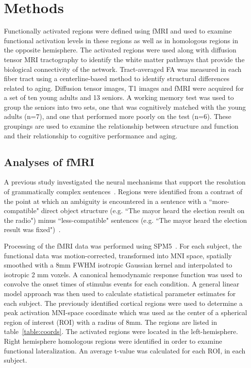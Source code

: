 \section{Methods}
\label{sec:methods}
Functionally activated regions were defined using fMRI and used to examine functional activation levels in these regions as well as in homologous regions in the opposite hemisphere. The activated regions were used along with diffusion tensor MRI tractography to identify the white matter pathways that provide the biological connectivity of the network. Tract-averaged FA was measured in each fiber tract using a centerline-based method to identify structural differences related to aging. Diffusion tensor images, T1 images and fMRI were acquired for a set of ten young adults and 13 seniors. A working memory test was used to group the seniors into two sets, one that was cognitively matched with the young adults (n=7), and one that performed more poorly on the test (n=6). These groupings are used to examine the relationship between structure and function and their relationship to cognitive performance and aging. 

\subsection{Analyses of fMRI}
A previous study investigated the neural mechanisms that support the resolution of grammatically complex sentences~\cite{Gunawardena2009}. Regions were identified from a contrast of the point at which an ambiguity is encountered in a sentence with a  ``more-compatible" direct object structure (e.g. ``The mayor heard the election result on the radio") minus ``less-compatible" sentences (e.g. ``The mayor heard the election result was fixed")~\cite{Gunawardena2009}. 

Processing of the fMRI data was performed using SPM5~\cite{SPM5}. For each subject, the functional data was motion-corrected, transformed into MNI space, spatially smoothed with a 8mm FWHM isotropic Gaussian kernel and interpolated to isotropic 2 mm voxels. A canonical hemodynamic response function was used to convolve the onset times of stimulus events for each condition. A general linear model approach was then used to calculate statistical parameter estimates for each subject. The previously identified cortical regions were used to determine a peak activation MNI-space coordinate which was used as the center of a spherical region of interest (ROI) with a radius of 8mm. The regions are listed in table~\ref{table:coords}. The activated regions were located in the left-hemisphere. Right hemisphere homologous regions were identified in order to examine functional lateralization. An average t-value was calculated for each ROI, in each subject. 

